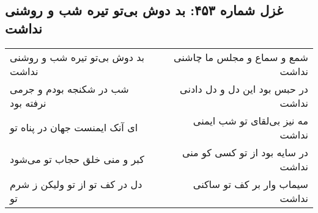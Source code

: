 \begin{center}
\section*{غزل شماره ۴۵۳: بد دوش بی‌تو تیره شب و روشنی نداشت}
\label{sec:0453}
\begin{longtable}{l p{0.5cm} r}
بد دوش بی‌تو تیره شب و روشنی نداشت
&&
شمع و سماع و مجلس ما چاشنی نداشت
\\
شب در شکنجه بودم و جرمی نرفته بود
&&
در حبس بود این دل و دل دادنی نداشت
\\
ای آنک ایمنست جهان در پناه تو
&&
مه نیز بی‌لقای تو شب ایمنی نداشت
\\
کبر و منی خلق حجاب تو می‌شود
&&
در سایه بود از تو کسی کو منی نداشت
\\
دل در کف تو از تو ولیکن ز شرم تو
&&
سیماب وار بر کف تو ساکنی نداشت
\\
\end{longtable}
\end{center}
